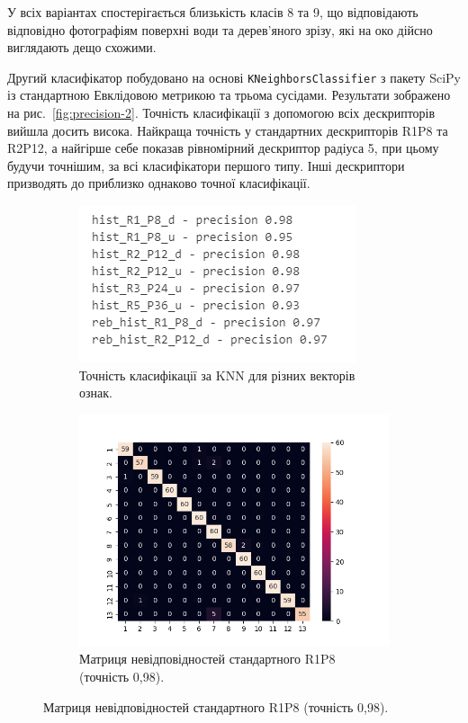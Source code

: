 У всіх варіантах спостерігається близькість класів 8 та 9, що відповідають відповідно фотографіям поверхні води та дерев'яного зрізу,
які на око дійсно виглядають дещо схожими. 

Другий класифікатор побудовано на основі \verb|KNeighborsClassifier| з пакету SciPy із стандартною Евклідовою метрикою та трьома сусідами.
Результати зображено на рис.~\ref{fig:precision-2}. 
Точність класифікації з допомогою всіх дескрипторів вийшла досить висока.
Найкраща точність у стандартних дескрипторів R1P8 та R2P12, а
найгірше себе показав рівномірний дескриптор радіуса 5, при цьому будучи точнішим, за всі класифікатори першого типу.
Інші дескриптори призводять до приблизко однаково точної класифікації.

\begin{figure}[h]
    \begin{subfigure}{0.5\textwidth}
    \includegraphics[width=0.95\linewidth]{img/precision-2.png} 
    \caption{
        Точність класифікації за KNN для різних векторів ознак.
    }
    \end{subfigure}%
    \begin{subfigure}{0.5\textwidth}
    \includegraphics[width=0.95\linewidth]{img/confusion/knn-hist_R1_P8_d.png}
    \caption{
        Матриця невідповідностей стандартного R1P8 (точність 0,98).
    }
    \end{subfigure}


\end{figure}
